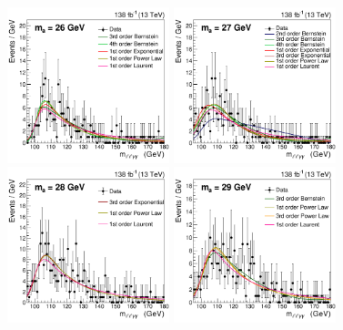 \begin{figure}[htbp]
  \begin{center}
		\includegraphics[width=0.42\textwidth]{Thesis (Version 2246)/figures/chapter04/inter_mass_bkg/bkgplot_m26.pdf}
        \includegraphics[width=0.42\textwidth]{Thesis (Version 2246)/figures/chapter04/inter_mass_bkg/bkgplot_m27.pdf} \\
		\includegraphics[width=0.42\textwidth]{Thesis (Version 2246)/figures/chapter04/inter_mass_bkg/bkgplot_m28.pdf}
		\includegraphics[width=0.42\textwidth]{Thesis (Version 2246)/figures/chapter04/inter_mass_bkg/bkgplot_m29.pdf}\\
\end{center}
\end{figure}